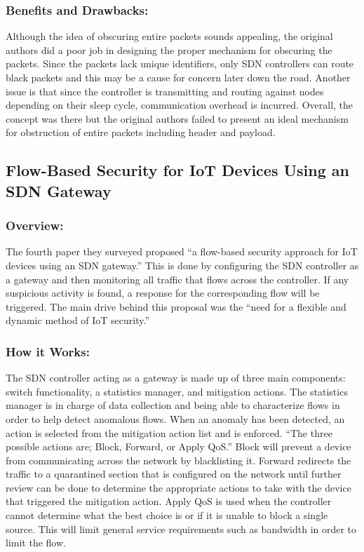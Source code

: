 \subsubsection {Benefits and Drawbacks:}

Although the idea of obscuring entire packets sounds appealing, the original authors did a poor job in designing the proper mechanism for obscuring the packets. Since the packets lack unique identifiers, only SDN controllers can route black packets and this may be a cause for concern later down the road. Another issue is that since the controller is transmitting and routing against nodes depending on their sleep cycle, communication overhead is incurred. Overall, the concept was there but the original authors failed to present an ideal mechanism for obstruction of entire packets including header and payload. 

\subsection {Flow-Based Security for IoT Devices Using an SDN Gateway}
\subsubsection {Overview:}

The fourth paper they surveyed proposed “a flow-based security approach for IoT devices using an SDN gateway.” \cite {kalkan2017securing} This is done by configuring the SDN controller as a gateway and then monitoring all traffic that flows across the controller. If any suspicious activity is found, a response for the corresponding flow will be triggered. The main drive behind this proposal was the “need for a flexible and dynamic method of IoT security.” \cite {bull2016flow}

\subsubsection {How it Works:}

The SDN controller acting as a gateway is made up of three main components: switch functionality, a statistics manager, and mitigation actions. The statistics manager is in charge of data collection and being able to characterize flows in order to help detect anomalous flows. When an anomaly has been detected, an action is selected from the mitigation action list and is enforced. “The three possible actions are; Block, Forward, or Apply QoS.” \cite {bull2016flow} Block will prevent a device from communicating across the network by blacklisting it. Forward redirects the traffic to a quarantined section that is configured on the network until further review can be done to determine the appropriate actions to take with the device that triggered the mitigation action. Apply QoS is used when the controller cannot determine what the best choice is or if it is unable to block a single source. This will limit general service requirements such as bandwidth in order to limit the flow.

